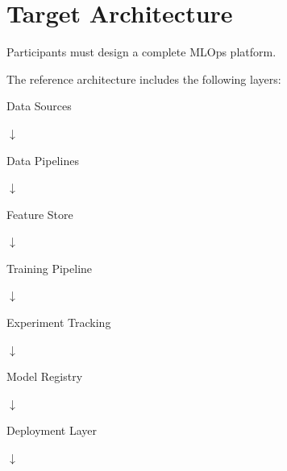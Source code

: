 \section{Target Architecture}

Participants must design a complete MLOps platform.

The reference architecture includes the following layers:

\begin{center}
Data Sources
\end{center}

\begin{center}
$\downarrow$
\end{center}

\begin{center}
Data Pipelines
\end{center}

\begin{center}
$\downarrow$
\end{center}

\begin{center}
Feature Store
\end{center}

\begin{center}
$\downarrow$
\end{center}

\begin{center}
Training Pipeline
\end{center}

\begin{center}
$\downarrow$
\end{center}

\begin{center}
Experiment Tracking
\end{center}

\begin{center}
$\downarrow$
\end{center}

\begin{center}
Model Registry
\end{center}

\begin{center}
$\downarrow$
\end{center}

\begin{center}
Deployment Layer
\end{center}

\begin{center}
$\downarrow$
\end{center}

